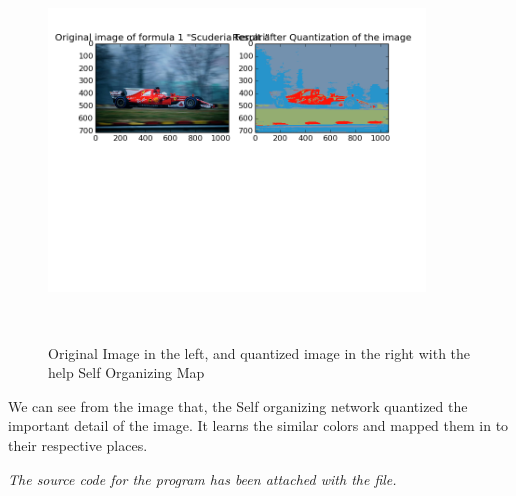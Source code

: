 \documentclass{article}
\begin{document}
\begin{figure}
  \centering
  \includegraphics[height=10cm, width=10cm]{i7.png}
  \caption{Original Image in the left, and quantized image in the right with
  the help Self Organizing Map}
\end{figure}

We can see from the image that, the Self organizing network quantized the
important detail of the image. It learns the similar colors and mapped them in
to their respective places. 




\textit{The source code for the program has been attached with the file.}
\end{document}
